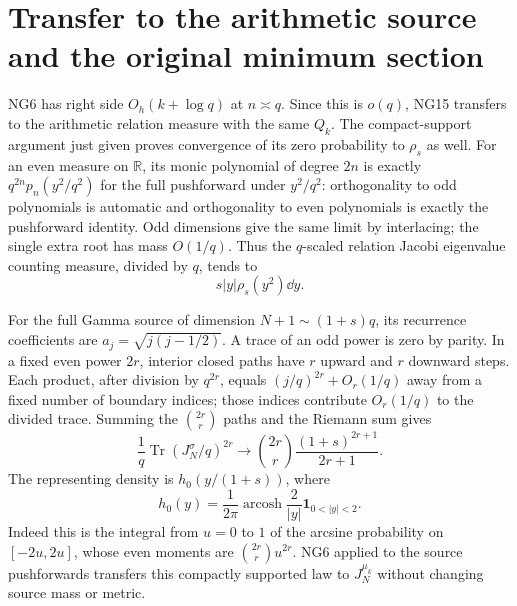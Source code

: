 \documentclass[11pt]{article}
\newcommand{\R}{\mathbb R}\newcommand{\C}{\mathbb C}
\newcommand{\Tr}{\operatorname{Tr}}\newcommand{\rank}{\operatorname{rank}}
\begin{document}
\section{Transfer to the arithmetic source and the original minimum section}
NG6 has right side $O_h(k+\log q)$ at $n\asymp q$. Since this is
$o(q)$, NG15 transfers to the arithmetic relation measure with the
same $Q_k$. The compact-support argument just given proves convergence
of its zero probability to $\rho_s$ as well. For an even measure on
$\R$, its monic polynomial of degree $2n$ is exactly
$q^{2n}p_n(y^2/q^2)$ for the full pushforward under $y^2/q^2$:
orthogonality to odd polynomials is automatic and orthogonality to
even polynomials is exactly the pushforward identity. Odd dimensions
give the same limit by interlacing; the single extra root has mass
$O(1/q)$. Thus the $q$-scaled relation Jacobi eigenvalue counting
measure, divided by $q$, tends to
\begin{equation}\tag{NG16}
                         s|y|\rho_s(y^2)\dd y.
\end{equation}

For the full Gamma source of dimension $N+1\sim(1+s)q$, its recurrence
coefficients are $a_j=\sqrt{j(j-1/2)}$. A trace of an odd power is zero
by parity. In a fixed even power $2r$, interior closed paths have $r$
upward and $r$ downward steps. Each product, after division by $q^{2r}$,
equals $(j/q)^{2r}+O_r(1/q)$ away from a fixed number of boundary
indices; those indices contribute $O_r(1/q)$ to the divided trace.
Summing the $\binom{2r}{r}$ paths and the Riemann sum gives
\[
 \frac1q\Tr(J_N^\sigma/q)^{2r}\longrightarrow
 \binom{2r}{r}\frac{(1+s)^{2r+1}}{2r+1}.
\]
The representing density is $h_0(y/(1+s))$, where
\begin{equation}\tag{NG17}
 h_0(y)=\frac1{2\pi}\operatorname{arcosh}\frac2{|y|}
                      \mathbf1_{0<|y|<2}.
\end{equation}
Indeed this is the integral from $u=0$ to $1$ of the arcsine probability
on $[-2u,2u]$, whose even moments are $\binom{2r}{r}u^{2r}$.
NG6 applied to the source pushforwards transfers this compactly
supported law to $J_N^{\mu_k}$ without changing source mass or metric.
\end{document}

